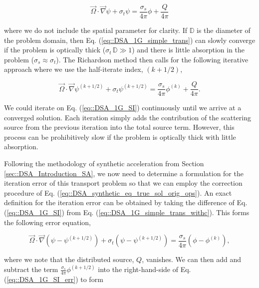 \begin{equation}
\label{eq::DSA_1G_simple_trans}
\vec{\Omega} \cdot \vec{\nabla} \psi + \sigma_t \psi =  \frac{ \sigma_s}{4 \pi} \phi + \frac{Q}{4 \pi}
\end{equation}

\noindent where we do not include the spatial parameter for clarity. If $\mathbb{D}$ is the diameter of the problem domain, then Eq. (\ref{eq::DSA_1G_simple_trans}) can slowly converge if the problem is optically thick ($ \sigma_t \, \mathbb{D} \gg 1$) and there is little absorption in the problem ($\sigma_s \approx \sigma_t$). The Richardson method then calls for the following iterative approach where we use the half-iterate index, ${(k+1/2)}$,

\begin{equation}
\label{eq::DSA_1G_SI}
\vec{\Omega} \cdot \vec{\nabla} \psi^{(k+1/2)} + \sigma_t \psi^{(k+1/2)} =   \frac{ \sigma_s}{4 \pi} \phi^{(k)} + \frac{Q}{4 \pi}. 
\end{equation}

\noindent We could iterate on Eq. (\ref{eq::DSA_1G_SI}) continuously until we arrive at a converged solution. Each iteration simply adds the contribution of the scattering source from the previous iteration into the total source term. However, this process can be prohibitively slow if the problem is optically thick with little absorption. 

Following the methodology of synthetic acceleration from Section \ref{sec::DSA_Introduction_SA}, we now need to determine a formulation for the iteration error of this transport problem so that we can employ the correction procedure of Eq. (\ref{eq::DSA_synthetic_eq_true_sol_orig_ops}). An exact definition for the iteration error can be obtained by taking the difference of Eq. (\ref{eq::DSA_1G_SI}) from Eq. (\ref{eq::DSA_1G_simple_trans_withc}). This forms the following error equation,

\begin{equation}
\label{eq::DSA_1G_SI_err}
\vec{\Omega} \cdot \vec{\nabla} \left( \psi - \psi^{(k+1/2)} \right) + \sigma_t \left( \psi -  \psi^{(k+1/2)}\right) =   \frac{ \sigma_s}{4 \pi} \left( \phi -  \phi^{(k)}\right)  ,
\end{equation}

\noindent where we note that the distributed source, $Q$, vanishes. We can then add and subtract the term $ \frac{ \sigma_s}{4 \pi} \phi^{(k+1/2)}$ into the right-hand-side of Eq. (\ref{eq::DSA_1G_SI_err}) to form 


